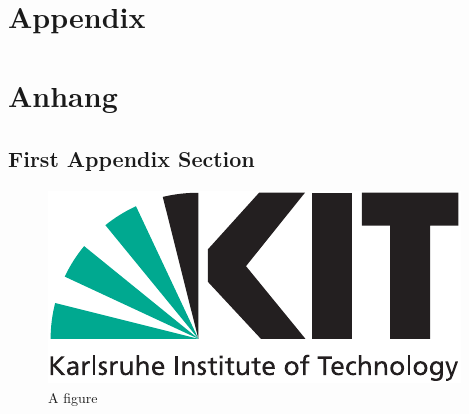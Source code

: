 {\chapter{Appendix}}    %
{\chapter{Anhang}}      %
\label{chap:appendix}


\section{First Appendix Section}
\label{sec:appendix:FirstSection}
		
\setcounter{figure}{0}
		
\begin{figure} [ht]
  \centering
  \includegraphics[width=.5\linewidth]{logos/kitlogo_en_cmyk}
  \caption{A figure}
  \label{fig:anotherfigure}
\end{figure}

